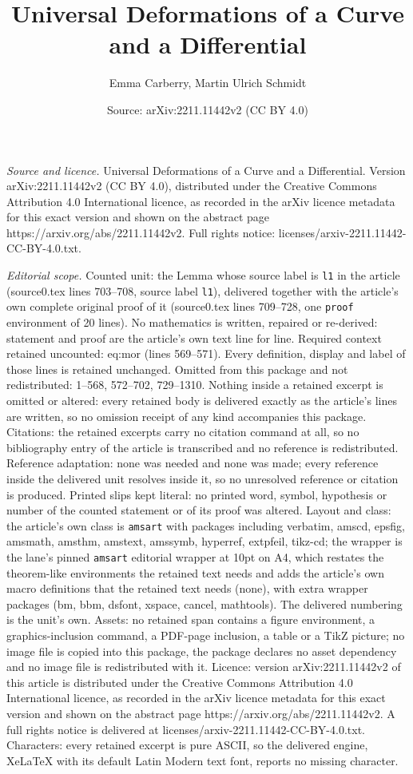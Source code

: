 \documentclass[10pt,a4paper]{amsart}
\title[Universal Deformations of a Curve and a Differential]{Universal Deformations of a Curve and a Differential}
\author{Emma Carberry, Martin Ulrich Schmidt}
\date{Source: arXiv:2211.11442v2 (CC BY 4.0)}
\begin{document}
\maketitle

\noindent\emph{Source and licence.} Universal Deformations of a Curve and a Differential. Version arXiv:2211.11442v2 (CC BY 4.0), distributed under the Creative Commons Attribution 4.0 International licence, as recorded in the arXiv licence metadata for this exact version and shown on the abstract page https://arxiv.org/abs/2211.11442v2. Full rights notice: licenses/arxiv-2211.11442-CC-BY-4.0.txt.\par\smallskip

\noindent\textit{Editorial scope.} Counted unit: the Lemma whose source label is \texttt{l1} in the article (source0.tex lines 703--708, source label \texttt{l1}), delivered together with the article's own complete original proof of it (source0.tex lines 709--728, one \texttt{proof} environment of 20 lines). No mathematics is written, repaired or re-derived: statement and proof are the article's own text line for line. Required context retained uncounted: eq:mor (lines 569--571). Every definition, display and label of those lines is retained unchanged. Omitted from this package and not redistributed: 1--568, 572--702, 729--1310. Nothing inside a retained excerpt is omitted or altered: every retained body is delivered exactly as the article's lines are written, so no omission receipt of any kind accompanies this package. Citations: the retained excerpts carry no citation command at all, so no bibliography entry of the article is transcribed and no reference is redistributed. Reference adaptation: none was needed and none was made; every reference inside the delivered unit resolves inside it, so no unresolved reference or citation is produced. Printed slips kept literal: no printed word, symbol, hypothesis or number of the counted statement or of its proof was altered. Layout and class: the article's own class is \texttt{amsart} with packages including verbatim, amscd, epsfig, amsmath, amsthm, amstext, amssymb, hyperref, extpfeil, tikz-cd; the wrapper is the lane's pinned \texttt{amsart} editorial wrapper at 10pt on A4, which restates the theorem-like environments the retained text needs and adds the article's own macro definitions that the retained text needs (none), with extra wrapper packages (bm, bbm, dsfont, xspace, cancel, mathtools). The delivered numbering is the unit's own. Assets: no retained span contains a figure environment, a graphics-inclusion command, a PDF-page inclusion, a table or a TikZ picture; no image file is copied into this package, the package declares no asset dependency and no image file is redistributed with it. Licence: version arXiv:2211.11442v2 of this article is distributed under the Creative Commons Attribution 4.0 International licence, as recorded in the arXiv licence metadata for this exact version and shown on the abstract page https://arxiv.org/abs/2211.11442v2. A full rights notice is delivered at licenses/arxiv-2211.11442-CC-BY-4.0.txt. Characters: every retained excerpt is pure ASCII, so the delivered engine, XeLaTeX with its default Latin Modern text font, reports no missing character.
\end{document}
